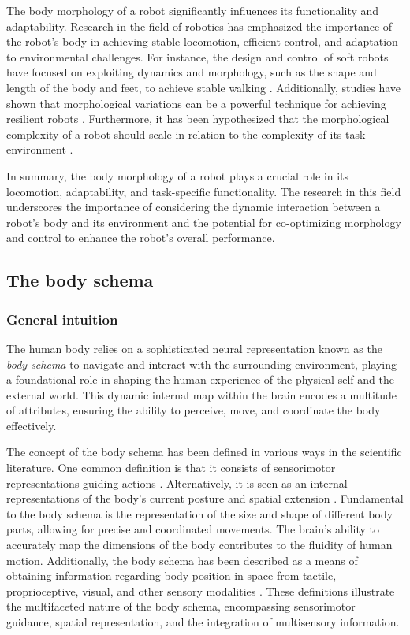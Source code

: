 The body morphology of a robot significantly influences its functionality and adaptability. Research in the field of robotics has emphasized the importance of the robot's body in achieving stable locomotion, efficient control, and adaptation to environmental challenges. For instance, the design and control of soft robots have focused on exploiting dynamics and morphology, such as the shape and length of the body and feet, to achieve stable walking \cite{Pfeifer2007SelfOrganizationEmbodiment}. Additionally, studies have shown that morphological variations can be a powerful technique for achieving resilient robots \cite{Pagliuca2020dynamicbodybrain}. Furthermore, it has been hypothesized that the morphological complexity of a robot should scale in relation to the complexity of its task environment \cite{Auerbach2012RelationshipEnvironmentalMechanical}.

In summary, the body morphology of a robot plays a crucial role in its locomotion, adaptability, and task-specific functionality. The research in this field underscores the importance of considering the dynamic interaction between a robot's body and its environment and the potential for co-optimizing morphology and control to enhance the robot's overall performance.

\subsection{The body schema}

\subsubsection{General intuition}
The human body relies on a sophisticated neural representation known as the \textit{body schema} to navigate and interact with the surrounding environment, playing a foundational role in shaping the human experience of the physical self and the external world. This dynamic internal map within the brain encodes a multitude of attributes, ensuring the ability to perceive, move, and coordinate the body effectively.

The concept of the body schema has been defined in various ways in the scientific literature. One common definition is that it consists of sensorimotor representations guiding actions \cite{Maravita2003MultisensoryIntegrationBody}. Alternatively, it is seen as an internal representations of the body's current posture and spatial extension \cite{Vignemont2010Bodyschemabody}. Fundamental to the body schema is the representation of the size and shape of different body parts, allowing for precise and coordinated movements. The brain's ability to accurately map the dimensions of the body contributes to the fluidity of human motion. Additionally, the body schema has been described as a means of obtaining information regarding body position in space from tactile, proprioceptive, visual, and other sensory modalities \cite{Medina2010mapsformspace}. These definitions illustrate the multifaceted nature of the body schema, encompassing sensorimotor guidance, spatial representation, and the integration of multisensory information.

